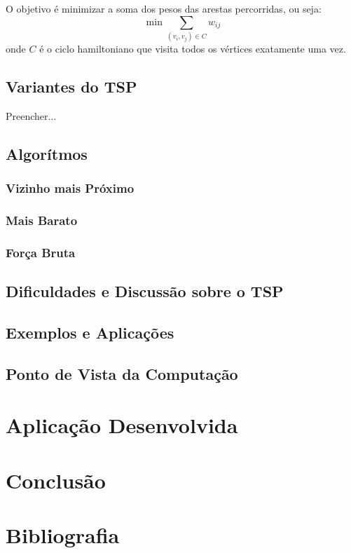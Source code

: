 \documentclass{article}
\begin{document}
\vspace{0.3cm}

O objetivo é minimizar a soma dos pesos das arestas percorridas, ou seja:
\[
\min \sum_{(v_i, v_j) \in C} w_{ij}
\]
onde $C$ é o ciclo hamiltoniano que visita todos os vértices exatamente uma vez.

\vspace{0.5cm}

\subsection{Variantes do TSP}
Preencher...

\vspace{0.5cm}

\subsection{Algorítmos}
\subsubsection{Vizinho mais Próximo}
\subsubsection{Mais Barato}
\subsubsection{Força Bruta}

\vspace{0.5cm}

\subsection{Dificuldades e Discussão sobre o TSP}

\vspace{0.5cm}

\subsection{Exemplos e Aplicações}

\vspace{0.5cm}

\subsection{Ponto de Vista da Computação}

\newpage

\section{Aplicação Desenvolvida}



\newpage

\section{Conclusão}

\newpage

\section{Bibliografia}
\end{document}
